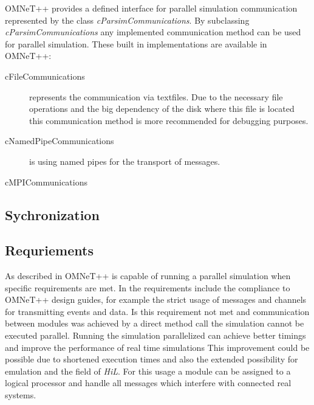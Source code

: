OMNeT++ provides a defined interface for parallel simulation communication represented by the class \emph{cParsimCommunications}.
By subclassing \emph{cParsimCommunications} any implemented communication method can be used for parallel simulation.
These built in implementations are available in OMNeT++: \cite{omnet_par_api}

\begin{description}
    \item[cFileCommunications] represents the communication via textfiles.
                               Due to the necessary file operations and the big dependency of the disk where this file is located this communication method is more recommended for debugging purposes.
    \item[cNamedPipeCommunications] is using named pipes for the transport of messages.
    \item[cMPICommunications] 
\end{description}


\subsection{Sychronization}
\label{sec:parallel_omnet_sync}

\subsection{Requriements}
\label{sec:parallel_omnet_requirements}

As described in \cite{varga_parallel_2003} OMNeT++ is capable of running a parallel simulation when specific requirements are met.
In \cite{varga_parallel_2003} the requirements include the compliance to OMNeT++ design guides, for example the strict usage of messages and channels for transmitting events and data.
Is this requirement not met and communication between modules was achieved by a direct method call the simulation cannot be executed parallel.
Running the simulation parallelized can achieve better timings and improve the performance of real time simulations
This improvement could be possible due to shortened execution times and also the extended possibility for emulation and the field of \emph{HiL}.
For this usage a module can be assigned to a logical processor and handle all messages which interfere with connected real systems.